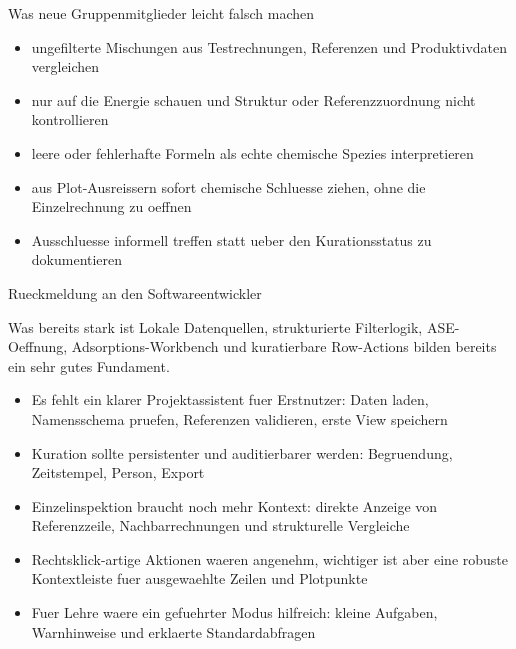 \documentclass[aspectratio=169,10pt]{beamer}
\begin{document}
\begin{frame}{Was neue Gruppenmitglieder leicht falsch machen}
  \begin{itemize}
    \item ungefilterte Mischungen aus Testrechnungen, Referenzen und Produktivdaten vergleichen
    \item nur auf die Energie schauen und Struktur oder Referenzzuordnung nicht kontrollieren
    \item leere oder fehlerhafte Formeln als echte chemische Spezies interpretieren
    \item aus Plot-Ausreissern sofort chemische Schluesse ziehen, ohne die Einzelrechnung zu oeffnen
    \item Ausschluesse informell treffen statt ueber den Kurationsstatus zu dokumentieren
  \end{itemize}
\end{frame}

\begin{frame}{Rueckmeldung an den Softwareentwickler}
  \begin{block}{Was bereits stark ist}
    Lokale Datenquellen, strukturierte Filterlogik, ASE-Oeffnung, Adsorptions-Workbench und kuratierbare Row-Actions bilden bereits ein sehr gutes Fundament.
  \end{block}

  \vspace{0.25cm}
  \begin{itemize}
    \item Es fehlt ein klarer Projektassistent fuer Erstnutzer: Daten laden, Namensschema pruefen, Referenzen validieren, erste View speichern
    \item Kuration sollte persistenter und auditierbarer werden: Begruendung, Zeitstempel, Person, Export
    \item Einzelinspektion braucht noch mehr Kontext: direkte Anzeige von Referenzzeile, Nachbarrechnungen und strukturelle Vergleiche
    \item Rechtsklick-artige Aktionen waeren angenehm, wichtiger ist aber eine robuste Kontextleiste fuer ausgewaehlte Zeilen und Plotpunkte
    \item Fuer Lehre waere ein gefuehrter Modus hilfreich: kleine Aufgaben, Warnhinweise und erklaerte Standardabfragen
  \end{itemize}
\end{frame}
\end{document}
